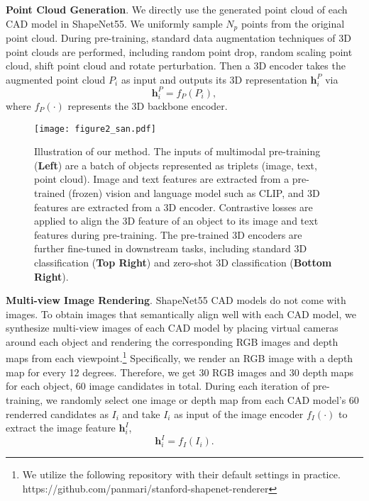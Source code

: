 \noindent\textbf{Point Cloud Generation}. We directly use the generated point cloud of each CAD model in ShapeNet55. We uniformly sample $N_p$ points from the original point cloud. During pre-training, standard data augmentation techniques of 3D point clouds are performed, including random point drop, random scaling point cloud, shift point cloud and rotate perturbation.
Then a 3D encoder takes the augmented point cloud $P_i$ as input and outputs its 3D representation $\mathbf{h}_i^{P}$ via
\begin{equation}
 \label{eq:3d-rep}
   \mathbf{h}_i^{P} = f_P(P_i),
\end{equation}
where $f_P(\cdot)$ represents the 3D backbone encoder.

\begin{figure*}[t]
    \centering
    \texttt{[image: figure2\_san.pdf]}
    \caption{Illustration of our method. The inputs of multimodal pre-training (\textbf{Left}) are a batch of objects represented as triplets (image, text, point cloud). Image and text features are extracted from a pre-trained (frozen) vision and language model such as CLIP, and 3D features are extracted from a 3D encoder. Contrastive losses are applied to align the 3D feature of an object to its image and text features during pre-training. The pre-trained 3D encoders are further fine-tuned in downstream tasks, including standard 3D classification (\textbf{Top Right}) and zero-shot 3D classification (\textbf{Bottom Right}).}
    \label{fig:method}
\end{figure*}

\noindent\textbf{Multi-view Image Rendering}. ShapeNet55 CAD models do not come with images. 
To obtain images that semantically align well with each CAD model, we synthesize multi-view images of each CAD model by placing virtual cameras around each object and rendering the corresponding RGB images and depth maps from each viewpoint.\footnote{We utilize the following repository with their default settings in practice. \newline https://github.com/panmari/stanford-shapenet-renderer} Specifically, we render an RGB image with a depth map for every 12 degrees. Therefore, we get 30 RGB images and 30 depth maps for each object, 60 image candidates in total. During each iteration of pre-training, we randomly select one image or depth map from each CAD model's 60 renderred candidates as $I_i$ and take $I_i$ as input of the image encoder $f_I(\cdot)$ to extract the image feature $\mathbf{h}_i^I$,
\begin{equation}
 \label{eq:image-rep}
   \mathbf{h}_i^{I} = f_I(I_i).
\end{equation}

